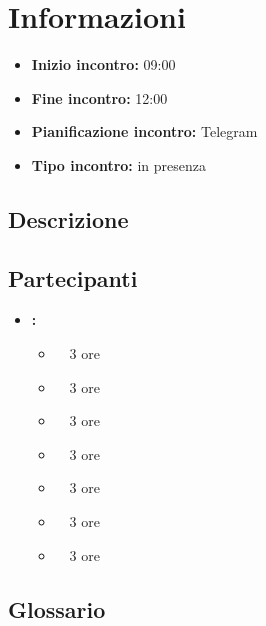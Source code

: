 \section{Informazioni}
\begin{itemize}
	\item \textbf{Inizio incontro:} 09:00
	\item \textbf{Fine incontro:} 12:00
	\item \textbf{Pianificazione incontro:} Telegram
	\item \textbf{Tipo incontro:} in presenza
\end{itemize}

\subsection{Descrizione}
\DocDescription

\subsection{Partecipanti}

\begin{itemize}
	\item \textbf{\GroupName:}
	\begin{itemize}
 		\item \tommaso \ \rightarrow\ 3 ore
   		\item \marco \ \rightarrow\ 3 ore
		\item \riccardo \ \rightarrow\ 3 ore
		\item \raul \ \rightarrow\ 3 ore
		\item \martina \ \rightarrow\ 3 ore
		\item \sebastiano \ \rightarrow\ 3 ore
		\item \mattia \ \rightarrow\ 3 ore
	\end{itemize}
\end{itemize}

\subsection{Glossario}
\GlossarioIntroduzione

\clearpage
